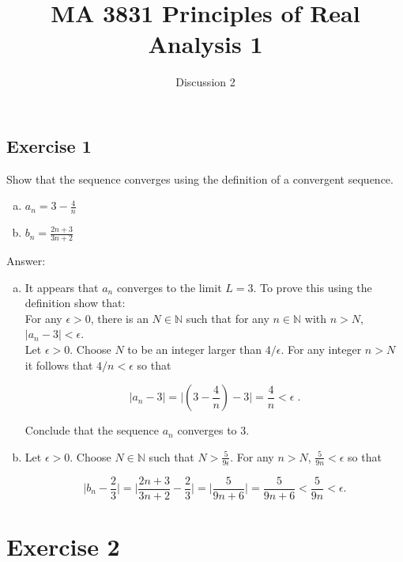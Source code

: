 \documentclass{article}
\title{MA 3831 Principles of Real Analysis 1 }
\author{Discussion 2}
\begin{document}
\maketitle


\subsection*{Exercise 1}

Show that the sequence converges using the definition of a convergent sequence.

\begin{enumerate}[a)]
\item $a_n = 3-\frac{4}{n}$

\item $b_n = \frac{2n+3}{3n+2}$
\end{enumerate} 

Answer:

\begin{enumerate}[a)]
\item It appears that $a_n$ converges to the limit $L = 3$. To prove this using the definition show that:\\

For any $\epsilon > 0$, there is an $N \in \mathbb{N}$ such that for any $n \in \mathbb{N}$ with $n > N$, $|a_n - 3| < \epsilon$. \\

Let $\epsilon > 0$. Choose $N$ to be an integer larger than $4/\epsilon$. For any integer $n > N$ it follows that $4/n < \epsilon$ so that

$$
|a_n - 3| = \biggr\lvert \left(3-\frac{4}{n}\right) - 3\biggr\rvert = \frac{4}{n} < \epsilon \;.
$$

Conclude that the sequence $a_n$ converges to 3.

\item Let $\epsilon > 0$. Choose $N \in \mathbb{N}$ such that $N > \frac{5}{9\epsilon}$. For any $n > N$, $\frac{5}{9n} < \epsilon$ so that

$$
\biggr\lvert b_n - \frac{2}{3} \biggr\lvert
= \biggr\lvert \frac{2n+3}{3n+2} - \frac{2}{3} \biggr\lvert
= \biggr\lvert \frac{5}{9n+6} \biggr\lvert
= \frac{5}{9n+6} 
< \frac{5}{9n}
< \epsilon .
$$
\end{enumerate}

\section*{Exercise 2}
\end{document}
